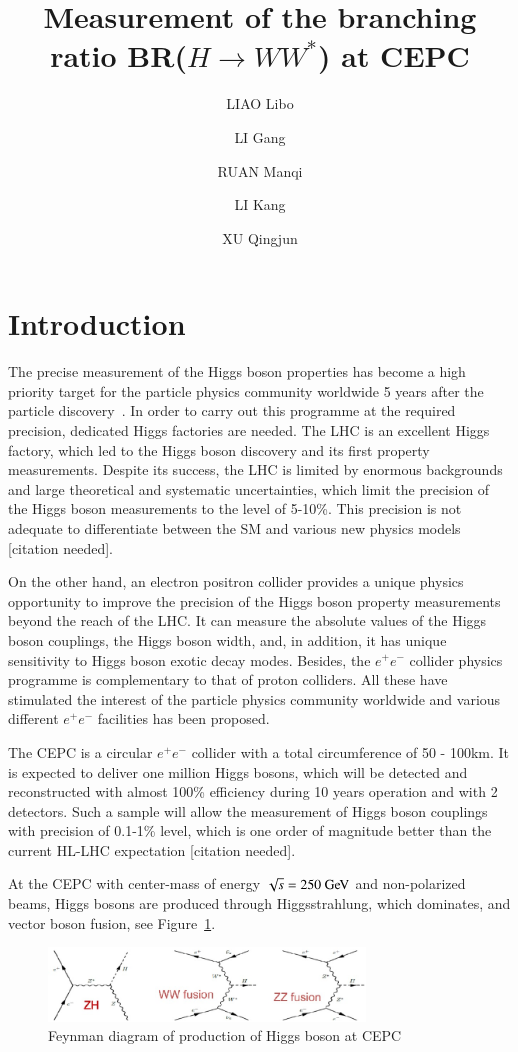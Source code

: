 \documentclass[11pt,a4paper]{cepcnote}
\title{ Measurement of the branching ratio BR($H\rightarrow WW^*$) at CEPC }
\author[a,b]{LIAO Libo}
\author[b]{LI Gang}
\author[b]{RUAN Manqi}
\author[a]{LI Kang}
\author[a]{XU Qingjun}
\affil[a]{Hangzhou Normal University}
\affil[b]{Institute of High Energy Physics}
\begin{document}
\tableofcontents
\clearpage

\section{Introduction}
The precise measurement of the Higgs boson properties has become a high priority target for the particle physics community worldwide 5 years after the particle discovery~\cite{wwnote}. In order to carry out this programme
at the required precision, dedicated Higgs factories are needed.
The LHC is an excellent Higgs factory, which led to the Higgs boson discovery
and its first property measurements. Despite its success, the LHC is limited 
by enormous backgrounds and large theoretical and systematic uncertainties, 
which limit the precision of the Higgs boson measurements to the level of
5-10\%. This precision is not adequate to differentiate between the SM and
various new physics models [citation needed].

On the other hand, an electron positron collider provides a unique physics 
opportunity to improve the precision of the Higgs boson property measurements 
beyond the reach of the LHC. It can measure the absolute values of the Higgs 
boson couplings, the Higgs boson width, and, in addition, it has unique 
sensitivity to Higgs boson exotic decay modes. Besides, the $e^+e^-$ collider 
physics programme is complementary to that of proton colliders. All these have
stimulated the interest of the particle physics community worldwide and
various different $e^+e^-$ facilities has been proposed. 

The CEPC is a circular $e^+e^-$ collider with a total circumference of 50 - 100km. It is expected to deliver one million 
Higgs bosons, which will be detected and reconstructed with almost 100\% efficiency during 10 years operation and with 2 detectors. Such a sample will  
allow the measurement of Higgs boson couplings with precision of 0.1-1\% level, which is one order of magnitude better than the current HL-LHC expectation [citation needed]. 

At the CEPC with center-mass of energy $\sqrt s = 250\gev$ and 
non-polarized beams, Higgs bosons are produced through  Higgsstrahlung, 
which dominates, and vector boson fusion, see  Figure~\ref{fig:fmd}.
\begin{figure}[H]
\begin{center}
\includegraphics[width=0.75\textwidth]{FMD}
\caption[]{Feynman diagram of production of Higgs boson at CEPC}
\label{fig:fmd}
\end{center}
\end{figure}
\end{document}
